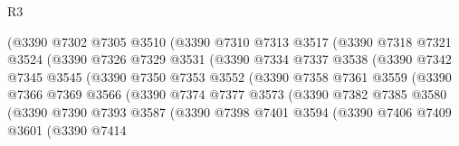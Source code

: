 \begin{lexlean}{R3}
\begin{coremodule}
                        (@3390
                          @7302
                          @7305
                          @3510
                          (@3390
                            @7310
                            @7313
                            @3517
                            (@3390
                              @7318
                              @7321
                              @3524
                              (@3390
                                @7326
                                @7329
                                @3531
                                (@3390
                                  @7334
                                  @7337
                                  @3538
                                  (@3390
                                    @7342
                                    @7345
                                    @3545
                                    (@3390
                                      @7350
                                      @7353
                                      @3552
                                      (@3390
                                        @7358
                                        @7361
                                        @3559
                                        (@3390
                                          @7366
                                          @7369
                                          @3566
                                          (@3390
                                            @7374
                                            @7377
                                            @3573
                                            (@3390
                                              @7382
                                              @7385
                                              @3580
                                              (@3390
                                                @7390
                                                @7393
                                                @3587
                                                (@3390
                                                  @7398
                                                  @7401
                                                  @3594
                                                  (@3390
                                                    @7406
                                                    @7409
                                                    @3601
                                                    (@3390
                                                      @7414

\end{coremodule}
\end{lexlean}
